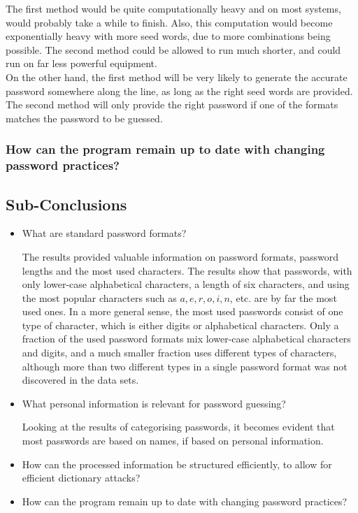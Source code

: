 \documentclass[a4paper,12pt]{article}
\begin{document}
The first method would be quite computationally heavy and on most systems, would probably take a while to finish. Also, this computation would become exponentially heavy with more seed words, due to more combinations being possible. The second method could be allowed to run much shorter, and could run on far less powerful equipment.\\
On the other hand, the first method will be very likely to generate the accurate password somewhere along the line, as long as the right seed words are provided. The second method will only provide the right password if one of the formats matches the password to be guessed. 

\subsubsection{How can the program remain up to date with changing password practices?}


\subsection{Sub-Conclusions}

\begin{itemize}
\item What are standard password formats?

  The results provided valuable information on password formats, password lengths and the most used characters. The results show that passwords, with only lower-case alphabetical characters, a length of six characters, and using the most popular characters such as $a,e,r,o,i,n$, etc. are by far the most used ones. In a more general sense, the most used passwords consist of one type of character, which is either digits or alphabetical characters. Only a fraction of the used password formats mix lower-case alphabetical characters and digits, and a much smaller fraction uses different types of characters, although more than two different types in a single password format was not discovered in the data sets.
  
\item What personal information is relevant for password guessing?

  Looking at the results of categorising passwords, it becomes evident that most passwords are based on names, if based on personal information.
  
\item How can the processed information be structured efficiently, to allow for efficient dictionary attacks?

\item How can the program remain up to date with changing password practices?

\end{itemize}
\end{document}
